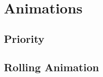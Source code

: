\chapter{Animations}
\label{cha:animations}

\section{Priority}
\label{sec:anim-pri}


\section{Rolling Animation}
\label{sec:rolling-anim}


